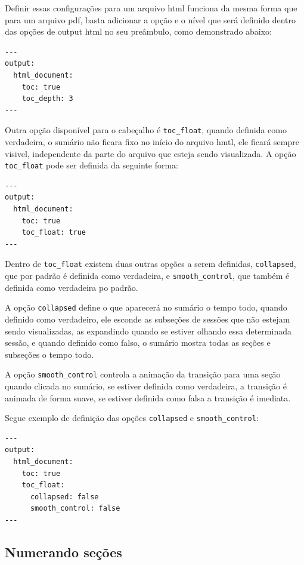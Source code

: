 \documentclass[
]{book}
\begin{document}
Definir essas configurações para um arquivo html funciona da mesma forma que para um arquivo pdf, basta adicionar a opção e o nível que será definido dentro das opções de output html no seu preâmbulo, como demonstrado abaixo:

\begin{verbatim}
---
output:
  html_document:
    toc: true
    toc_depth: 3
---
\end{verbatim}

Outra opção disponível para o cabeçalho é \texttt{toc\_float}, quando definida como verdadeira, o sumário não ficara fixo no início do arquivo hmtl, ele ficará sempre visivel, independente da parte do arquivo que esteja sendo visualizada. A opção \texttt{toc\_float} pode ser definida da seguinte forma:

\begin{verbatim}
---
output:
  html_document:
    toc: true
    toc_float: true
---
\end{verbatim}

Dentro de \texttt{toc\_float} existem duas outras opções a serem definidas, \texttt{collapsed}, que por padrão é definida como verdadeira, e \texttt{smooth\_control}, que também é definida como verdadeira po padrão.

A opção \texttt{collapsed} define o que aparecerá no sumário o tempo todo, quando definido como verdadeiro, ele esconde as subseções de sessões que não estejam sendo visualizadas, as expandindo quando se estiver olhando essa determinada sessão, e quando definido como falso, o sumário mostra todas as seções e subseções o tempo todo.

A opção \texttt{smooth\_control} controla a animação da transição para uma seção quando clicada no sumário, se estiver definida como verdadeira, a transição é animada de forma suave, se estiver definida como falsa a transição é imediata.

Segue exemplo de definição das opções \texttt{collapsed} e \texttt{smooth\_control}:

\begin{verbatim}
---
output:
  html_document:
    toc: true
    toc_float:
      collapsed: false
      smooth_control: false
---
\end{verbatim}

\hypertarget{numerando-seuxe7uxf5es}{%
\subsection{Numerando seções}\label{numerando-seuxe7uxf5es}}
\end{document}
